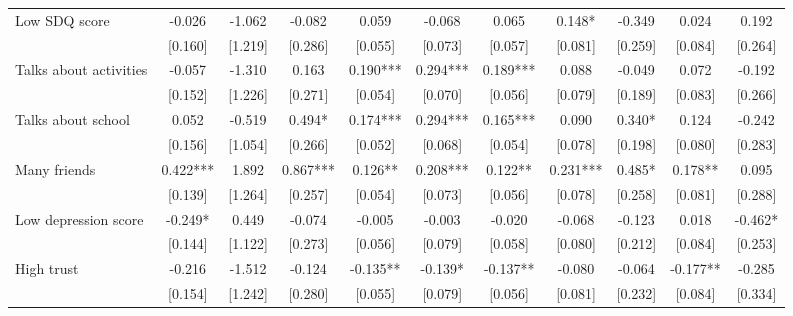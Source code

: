 \documentclass[12pt]{article}
\begin{document}
\begin{table}[ht]
\begin{center}
\begin{adjustbox}{width=1.2\textwidth,center=\textwidth}
\begin{tabular}{l*{10}{c}}
Low SDQ score  & -0.026 & -1.062 & -0.082 & 0.059 & -0.068 & 0.065 & 0.148* & -0.349 & 0.024 & 0.192 \\
 & [0.160] & [1.219] & [0.286] & [0.055] & [0.073] & [0.057] & [0.081] & [0.259] & [0.084] & [0.264] \\
Talks about activities & -0.057 & -1.310 & 0.163 & 0.190*** & 0.294*** & 0.189*** & 0.088 & -0.049 & 0.072 & -0.192 \\
 & [0.152] & [1.226] & [0.271] & [0.054] & [0.070] & [0.056] & [0.079] & [0.189] & [0.083] & [0.266] \\
Talks about school & 0.052 & -0.519 & 0.494* & 0.174*** & 0.294*** & 0.165*** & 0.090 & 0.340* & 0.124 & -0.242 \\
 & [0.156] & [1.054] & [0.266] & [0.052] & [0.068] & [0.054] & [0.078] & [0.198] & [0.080] & [0.283] \\
Many friends & 0.422*** & 1.892 & 0.867*** & 0.126** & 0.208*** & 0.122** & 0.231*** & 0.485* & 0.178** & 0.095 \\
 & [0.139] & [1.264] & [0.257] & [0.054] & [0.073] & [0.056] & [0.078] & [0.258] & [0.081] & [0.288] \\
Low depression score & -0.249* & 0.449 & -0.074 & -0.005 & -0.003 & -0.020 & -0.068 & -0.123 & 0.018 & -0.462* \\
 & [0.144] & [1.122] & [0.273] & [0.056] & [0.079] & [0.058] & [0.080] & [0.212] & [0.084] & [0.253] \\
High trust & -0.216 & -1.512 & -0.124 & -0.135** & -0.139* & -0.137** & -0.080 & -0.064 & -0.177** & -0.285 \\
 & [0.154] & [1.242] & [0.280] & [0.055] & [0.079] & [0.056] & [0.081] & [0.232] & [0.084] & [0.334] \\

\end{tabular}
\end{adjustbox}
\end{center}
\end{table}
\end{document}
